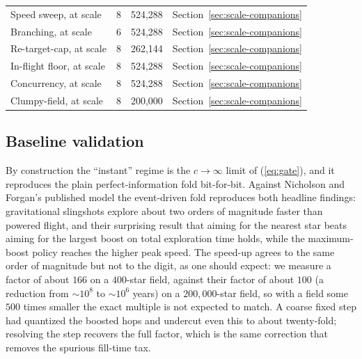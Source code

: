 \begin{table}[!t]
\begin{tabular}{lccl}
    Speed sweep, at scale   & 8  & 524{,}288 & Section~\ref{sec:scale-companions} \\
    Branching, at scale     & 6  & 524{,}288 & Section~\ref{sec:scale-companions} \\
    Re-target-cap, at scale & 8  & 262{,}144 & Section~\ref{sec:scale-companions} \\
    In-flight floor, at scale & 8 & 524{,}288 & Section~\ref{sec:scale-companions} \\
    Concurrency, at scale   & 8  & 524{,}288 & Section~\ref{sec:scale-companions} \\
    Clumpy-field, at scale  & 8  & 200{,}000 & Section~\ref{sec:scale-companions} \\
    \bottomrule
  \end{tabular}
\end{table}

\subsection{Baseline validation}
By construction the ``instant'' regime is the $c\to\infty$ limit of (\ref{eq:gate}), and it
reproduces the plain perfect-information fold bit-for-bit. Against Nicholson and Forgan's
published model \citep{nicholson-forgan-2013} the event-driven fold reproduces both headline
findings: gravitational slingshots explore about two orders of magnitude faster than powered
flight, and their surprising result that aiming for the nearest star beats aiming for the largest
boost on total exploration time holds, while the maximum-boost policy reaches the higher peak
speed. The speed-up agrees to the same order of magnitude but not to the digit, as one should
expect: we measure a factor of about $166$ on a $400$-star field, against their factor of about
$100$ (a reduction from $\sim\!10^8$ to $\sim\!10^6$ years) on a $200{,}000$-star field, so with a
field some $500$ times smaller the exact multiple is not expected to match. A coarse fixed step had
quantized the boosted hops and undercut even this to about twenty-fold; resolving the step recovers
the full factor, which is the same correction that removes the spurious fill-time tax.
